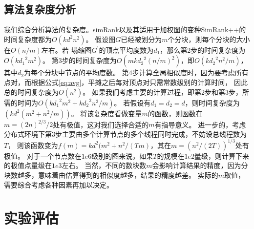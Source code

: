 \documentclass[master]{njuthesis}
\begin{document}
\subsection{算法复杂度分析}

我们综合分析算法的复杂度。simRank以及其适用于加权图的变种SimRank++的时间复杂度都为$O(kd^2n^2)$。
假设图$G$已经被划分为$m$个分块，则每个分块的大小在$O(n/m)$左右。若
塌缩图$G^\prime$的顶点平均度数为$d_1$，那么第2步的时间复杂度为$O(k{d_1}^2m^2)$。
第3步的时间复杂度为$O(mk{d_2}^2(n/m)^2)$，即$O(k{d_2}^2n^2/m)$，其中$d_2$为每个分块中节点的平均度数。
第4步计算全局相似度时，因为要考虑所有点对，而根据公式\ref{eq:avg}，平摊之后每对顶点对只需常数级别的计算时间，
因此总的时间复杂度为$O(n^2)$。
如果我们考虑主要的计算过程，即第2步和第3步，所需的时间为$O(k{d_1}^2m^2+k{d_2}^2n^2/m)$。
若假设有$d_1=d_2=d$，则时间复杂度为$(kd^2(m^2+n^2/m))$。 
将该复杂度看做变量$m$的函数，则函数在$m=(2n)^{2/3}/2$处有极值，这对我们选择合适的$m$有指导意义。
进一步的，考虑分布式环境下第3步主要由多个计算节点的多个线程同时完成，不妨设总线程数为$T$，
则该函数变为$f(m)=kd^2(m^2+n^2/(Tm)$，其在$m=(n^2/(2T))^{1/3}$处有极值。
对于一个节点数在$1e6$级别的图来说，如果$T$的规模在$1e2$量级，则计算下来的极值点量级在$1e3$左右。
当然，不同的数块数$m$会影响计算结果的精度，因为分块数越多，意味着由估算得到的相似度越多，结果的精度越差。
实际的$m$取值，需要综合考虑各种因素再加以决定。

\section{实验评估}
\end{document}
